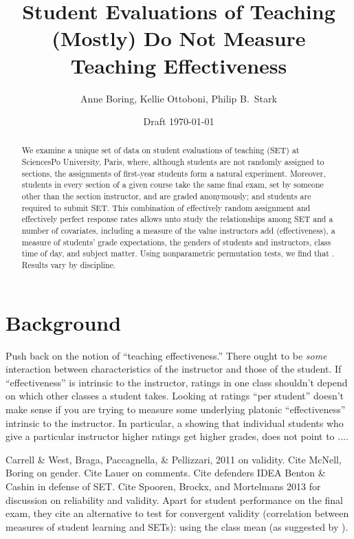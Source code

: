 \documentclass[12pt]{article}
\title{Student Evaluations of Teaching (Mostly) Do Not Measure Teaching Effectiveness}
\author{Anne Boring, Kellie Ottoboni, Philip B.~Stark}
\date{Draft \today}
\newcommand{\todo}[1]{{\color{red}{TO DO: \sc #1}}}
\begin{document}
\maketitle

\begin{abstract}
We examine a unique set of data on student evaluations of teaching (SET) at SciencesPo
University, Paris, where, although students are not randomly assigned to sections,
the assignments of first-year students form a natural experiment.
Moreover, students in every section of a given course take the same final exam, set by
someone other than the section instructor, and are graded anonymously;
and students are required to submit SET.
This combination of effectively random assignment and effectively perfect response
rates allows unto study the relationships among SET and a number of covariates,
including a measure of the value instructors add (effectiveness), 
a measure of students' grade expectations, the genders of students and
instructors, class time of day, and subject matter.
Using nonparametric permutation tests, we find that \todo{more!}.
Results vary by discipline.

\end{abstract}

\section{Background}
Push back on the notion of ``teaching effectiveness.''
There ought to be \emph{some} interaction between characteristics of the
instructor and those of the student.
If ``effectiveness'' is intrinsic to the instructor, ratings in one class shouldn't depend on
which other classes a student takes.
Looking at ratings ``per student'' doesn't make sense if you are trying to
measure some underlying platonic ``effectiveness'' intrinsic to the instructor.
In particular,  a showing that individual students who give a particular instructor higher ratings
get higher grades, does not point to ....\todo{fix me}

Carrell \& West, Braga, Paccagnella, \& Pellizzari, 2011 on validity.
Cite McNell, Boring on gender.
Cite Lauer on comments.
Cite defenders IDEA Benton \& Cashin in defense of SET.  
Cite Spooren, Brockx, and Mortelmans 2013 for discussion on reliability and validity. 
Apart for student performance on 
the final exam, they cite an alternative to test for convergent validity 
(correlation between measures of student learning 
and SETs): using the class mean (as suggested by \cite{clayson09}). 
\end{document}
